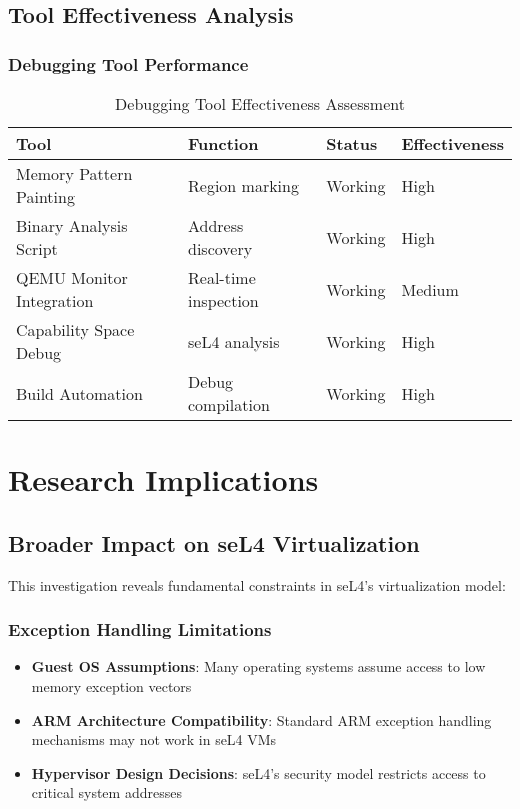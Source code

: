 \documentclass[11pt,a4paper]{article}
\begin{document}
\subsection{Tool Effectiveness Analysis}

\subsubsection{Debugging Tool Performance}

\begin{table}[h]
\centering
\begin{tabular}{@{}llll@{}}
\toprule
\textbf{Tool} & \textbf{Function} & \textbf{Status} & \textbf{Effectiveness} \\
\midrule
Memory Pattern Painting & Region marking & Working & High \\
Binary Analysis Script & Address discovery & Working & High \\
QEMU Monitor Integration & Real-time inspection & Working & Medium \\
Capability Space Debug & seL4 analysis & Working & High \\
Build Automation & Debug compilation & Working & High \\
\bottomrule
\end{tabular}
\caption{Debugging Tool Effectiveness Assessment}
\label{tab:tool_effectiveness}
\end{table}

\section{Research Implications}

\subsection{Broader Impact on seL4 Virtualization}

This investigation reveals fundamental constraints in seL4's virtualization model:

\subsubsection{Exception Handling Limitations}

\begin{itemize}
    \item \textbf{Guest OS Assumptions}: Many operating systems assume access to low memory exception vectors
    \item \textbf{ARM Architecture Compatibility}: Standard ARM exception handling mechanisms may not work in seL4 VMs
    \item \textbf{Hypervisor Design Decisions}: seL4's security model restricts access to critical system addresses
\end{itemize}
\end{document}
